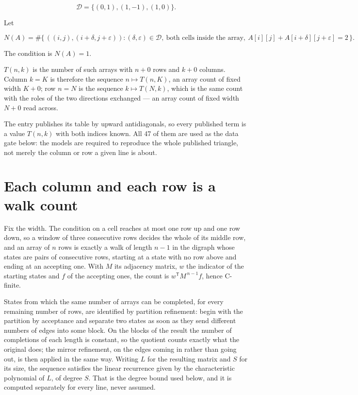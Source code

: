 \documentclass[11pt]{article}
\theoremstyle{definition}
\begin{document}
\[\mathcal{D} = \{(0,1), (1,-1), (1,0)\}.\]

Let

\[N(A) = \#\bigl\{\,((i,j),(i{+}\delta,j{+}\varepsilon)) : (\delta,\varepsilon) \in \mathcal{D},\ \text{both cells inside the array},\ A[i][j] + A[i{+}\delta][j{+}\varepsilon] = 2\,\bigr\}.\]

The condition is $N(A) = 1$.

$T(n,k)$ is the number of such arrays with $n + 0$ rows and $k + 0$ columns. Column $k = K$ is therefore the sequence $n \mapsto T(n,K)$, an array count of fixed width $K + 0$; row $n = N$ is the sequence $k \mapsto T(N,k)$, which is the same count with the roles of the two directions exchanged --- an array count of fixed width $N + 0$ read across.

The entry publishes its table by upward antidiagonals, so every published term is a value $T(n,k)$ with both indices known. All 47 of them are used as the data gate below: the models are required to reproduce the whole published triangle, not merely the column or row a given line is about.

\section{Each column and each row is a walk count}

Fix the width. The condition on a cell reaches at most one row up and one row down, so a window of three consecutive rows decides the whole of its middle row, and an array of $n$ rows is exactly a walk of length $n-1$ in the digraph whose states are pairs of consecutive rows, starting at a state with no row above and ending at an accepting one. With $M$ its adjacency matrix, $w$ the indicator of the starting states and $f$ of the accepting ones, the count is $w^{\mathsf T}M^{\,n-1}f$, hence C-finite.

States from which the same number of arrays can be completed, for every remaining number of rows, are identified by partition refinement: begin with the partition by acceptance and separate two states as soon as they send different numbers of edges into some block. On the blocks of the result the number of completions of each length is constant, so the quotient counts exactly what the original does; the mirror refinement, on the edges coming in rather than going out, is then applied in the same way. Writing $L$ for the resulting matrix and $S$ for its size, the sequence satisfies the linear recurrence given by the characteristic polynomial of $L$, of degree $S$. That is the degree bound used below, and it is computed separately for every line, never assumed.
\end{document}
